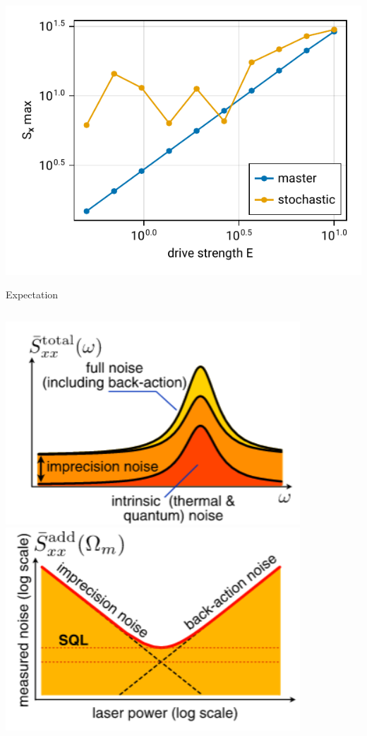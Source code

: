 \documentclass{beamer}
\begin{document}
\begin{frame}{}
	\centering
	\includegraphics{figures/05 power.pdf}
\end{frame}

\begin{frame}{Expectation}
	\begin{columns}
		\includegraphics[width=\textwidth]{figures/a.png}
		\includegraphics[width=\textwidth]{figures/b.png}
	\end{columns}
\end{frame}


{
	\begin{frame}[plain]{}\end{frame}
}
\end{document}
